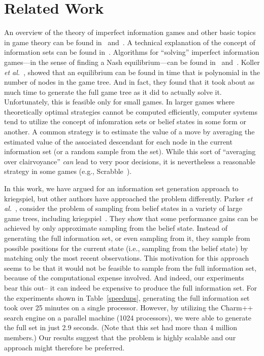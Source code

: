 \documentclass[conference]{IEEEtran}
\newcommand{\etal}{{\em et al.}\ }
\begin{document}
\section{Related Work}
An overview of the theory of imperfect information games and other basic topics in game theory can be found
in~\cite{kuhn03lectures} and~\cite{kuhn97classics}.  A technical explanation of the concept of information sets can be
found in~\cite{gilpin07algorithms}.  Algorithms for ``solving'' imperfect information games---in the sense of finding a
Nash equilibrium---can be found in~\cite{koller94fast} and~\cite{koller97representations}.  Koller \etal, showed that an
equilibrium can be found in time that is polynomial in the number of nodes in the game tree.  And in fact, they found
that it took about as much time to generate the full game tree as it did to actually solve it.  Unfortunately, this is
feasible only for small games.  In larger games where theoretically optimal strategies cannot be computed efficiently,
computer systems tend to utilize the concept of infomration sets or belief states in some form or another.  A common
strategy is to estimate the value of a move by averaging the estimated value of the associated descendant for each node
in the current information set (or a random sample from the set).  While this sort of ``averaging over clairvoyance''
{\em can} lead to very poor decisions, it is nevertheless a reasonable strategy in some games (e.g.,
Scrabble~\cite{sheppard02world}).

In this work, we have argued for an information set generation approach to kriegspiel, but other authors have approached
the problem differently.  Parker \etal, consider the problem of sampling from belief states in a variety of large game
trees, including kriegspiel~\cite{parker05game}.  They show that some performance gains can be achieved by only
approximate sampling from the belief state.  Instead of generating the full information set, or even sampling from it,
they sample from possible positions for the current state (i.e., sampling from the belief state) by matching only the
most recent observations.  This motivation for this approach seems to be that it would not be feasible to sample from
the full information set, because of the computational expense involved.  And indeed, our experiments bear this out-- it
can indeed be expensive to produce the full information set.  For the experiments shown in Table~\ref{speedups},
generating the full information set took over 25 minutes on a single processor.  However, by utilizing the Charm++
search engine on a parallel machine (1024 processors), we were able to generate the full set in just 2.9 seconds.  (Note
that this set had more than 4 million members.)  Our results suggest that the problem is highly scalable and our
approach might therefore be preferred.
\end{document}
